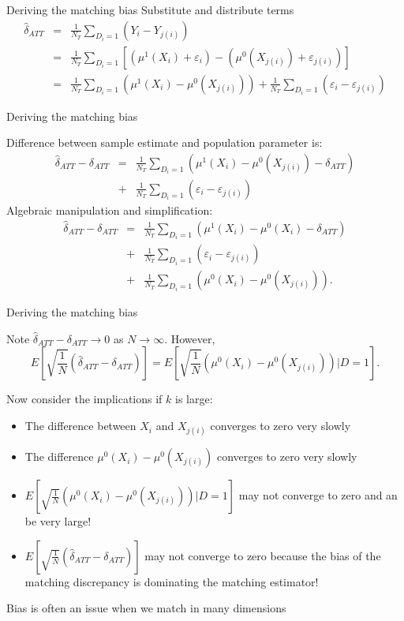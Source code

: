 \documentclass{beamer}
\begin{document}
\begin{frame}{Deriving the matching bias}
  Substitute and distribute terms
  \begin{eqnarray*}
    \widehat{\delta}_{ATT} &=& \frac{1}{N_T} \sum_{D_i=1} (Y_i - Y_{j(i)}) \\
    &=& \frac{1}{N_T} \sum_{D_i=1} \left[ (\mu^1(X_i) + \varepsilon_i) - (\mu^0(X_{j(i)}) + \varepsilon_{j(i)}) \right] \\
    &=&  \frac{1}{N_T} \sum_{D_i=1} (\mu^1(X_i) - \mu^0(X_{j(i)})) + \frac{1}{N_T} \sum_{D_i=1}(\varepsilon_i - \varepsilon_{j(i)})
  \end{eqnarray*}
\end{frame}
		

\begin{frame}{Deriving the matching bias}
	
Difference between sample estimate and population parameter is:
		\begin{eqnarray*}
		\widehat{\delta}_{ATT} - \delta_{ATT} &=& \frac{1}{N_T} \sum_{D_i=1} \left( \mu^1(X_i) - \mu^0(X_{j(i)}) - \delta_{ATT}\right) \\
		&+& \frac{1}{N_T} \sum_{D_i=1} (\varepsilon_i - \varepsilon_{j(i)})
		\end{eqnarray*}
Algebraic manipulation and simplification:
		\begin{eqnarray*}
		\widehat{\delta}_{ATT} - \delta_{ATT} &=& \frac{1}{N_T} \sum_{D_i=1} \left( \mu^1(X_i) - \mu^0(X_i) - \delta_{ATT}\right) \\
		&+& \frac{1}{N_T} \sum_{D_i=1} (\varepsilon_i - \varepsilon_{j(i)}) \\
		&+& \frac{1}{N_T} \sum_{D_i=1} \left( \mu^0(X_i) - \mu^0(X_{j(i)}) \right).
		\end{eqnarray*}
\end{frame}


\begin{frame}{Deriving the matching bias}
	
Note $\widehat{\delta}_{ATT} - \delta_{ATT} \to 0$ as $N \to \infty$.
\pause However, 
$$E[ \sqrt{\frac{1}{N}} (\widehat{\delta}_{ATT} - \delta_{ATT})] = E[ \sqrt{\frac{1}{N}} ( \mu^0(X_i) - \mu^0(X_{j(i)}) ) | D=1].$$ 

Now consider the implications if $k$ is large:
	\begin{itemize}
	\item The difference between $X_i$ and $X_{j(i)}$ converges to zero very slowly
	\item The difference $\mu^0(X_i) - \mu^0(X_{j(i)})$ converges to zero very slowly
	\item $E[ \sqrt{\frac{1}{N}} (\mu^0(X_i) - \mu^0(X_{j(i)})) | D=1]$ may not converge to zero and an be very large!
	\item $E[ \sqrt{\frac{1}{N}} (\widehat{\delta}_{ATT} - \delta_{ATT})]$ may not converge to zero because the bias of the matching discrepancy is dominating the matching estimator!
	\end{itemize}
Bias is often an issue when we match in many dimensions
\end{frame}
\end{document}
